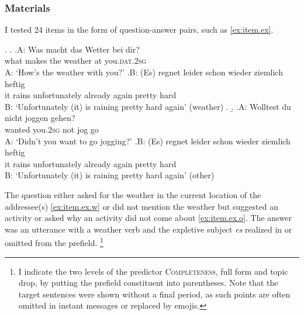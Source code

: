 \subsubsection{Materials}\label{sec:exp.ex.materials}
I tested 24 items in the form of question-answer pairs, such as \ref{ex:item.ex}.

\ex.\label{ex:item.ex}
\a.\label{ex:item.ex.w}
\ag.A: Was macht das Wetter bei dir?\\
{} what makes the weather at you.\textsc{dat.2sg}\\
A: `How's the weather with you?'
\bg.B: (Es) regnet leider schon wieder ziemlich heftig\\
{} it rains unfortunately already again pretty hard\\
B: `Unfortunately (it) is raining pretty hard again' \hfill (weather)
\z.
\b.\label{ex:item.ex.o}
\ag.A: Wolltest du nicht joggen gehen?\\
{} wanted you.\textsc{2sg} not jog go\\
A: `Didn't you want to go jogging?'
\bg.B: (Es) regnet leider schon wieder ziemlich heftig\\
{} it rains unfortunately already again pretty hard\\
B: `Unfortunately (it) is raining pretty hard again' \hfill (other)

The question either asked for the weather in the current location of the addressee(s) \ref{ex:item.ex.w} or did not mention the weather but suggested an activity or asked why an activity did not come about \ref{ex:item.ex.o}.
The answer was an utterance with a weather verb and the expletive subject \textit{es} realized in or omitted from the prefield.%
\footnote{I indicate the two levels of the predictor \textsc{Completeness}, full form and topic drop, by putting the prefield constituent into parentheses.
Note that the target sentences were shown without a final period, as such points are often omitted in instant messages or replaced by emojis.}
%

